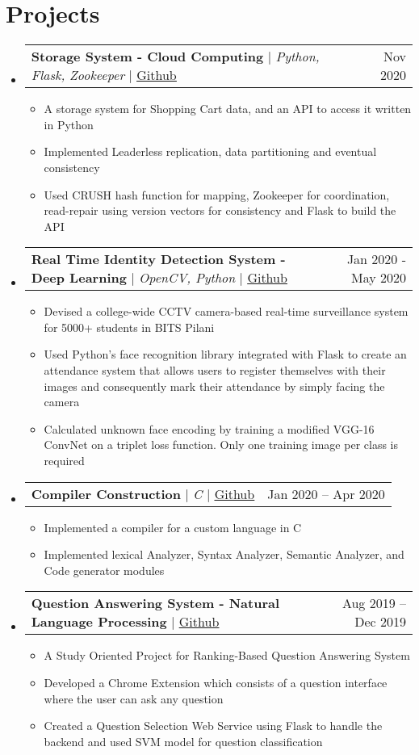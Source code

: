 \documentclass[res,10pt]{article}
\makeatletter
\newcommand{\resumeItem}[1]{
  \item\small{
    {#1 \vspace{-2pt}}
  }
}
\newcommand{\resumeProjectHeading}[2]{
    \item
    \begin{tabular*}{0.97\textwidth}{l@{\extracolsep{\fill}}r}
      \small#1 & #2 \\
    \end{tabular*}\vspace{-7pt}
}
\newcommand{\resumeSubHeadingListStart}{\begin{itemize}[leftmargin=0.15in, label={}]}
\newcommand{\resumeSubHeadingListEnd}{\end{itemize}}
\newcommand{\resumeItemListStart}{\begin{itemize}}
\newcommand{\resumeItemListEnd}{\end{itemize}\vspace{-5pt}}
\makeatother
\begin{document}
\section{Projects}
    \resumeSubHeadingListStart
      \resumeProjectHeading
          {\textbf{Storage System - Cloud Computing} $|$ \emph{Python, Flask, Zookeeper} $|$ \href{https://github.com/vismit2000/ShoppingCart-Cloud}{\underline{Github}}}{Nov 2020}
          \resumeItemListStart
            \resumeItem{A storage system for Shopping Cart data, and an API to access it written in Python}
            \resumeItem{Implemented Leaderless replication, data partitioning and eventual consistency}
            \resumeItem{Used CRUSH hash function for mapping, Zookeeper for coordination, read-repair using version vectors for consistency and Flask to build the API}
          \resumeItemListEnd
      \resumeProjectHeading
          {\textbf{Real Time Identity Detection System - Deep Learning} $|$ \emph{OpenCV, Python} $|$ \href{https://github.com/vismit2000/face-recognition-attendance-system}{\underline{Github}}}{Jan 2020 - May 2020}
          \resumeItemListStart
            \resumeItem{Devised a college-wide CCTV camera-based real-time surveillance system for 5000+ students in BITS Pilani}
            \resumeItem{Used Python’s face recognition library integrated with Flask to create an attendance system that allows users to register themselves with their images and consequently mark their attendance by simply facing the camera}
            \resumeItem{Calculated unknown face encoding by training a modified VGG-16 ConvNet on a triplet loss function. Only one training image per class is required}
          \resumeItemListEnd
      \resumeProjectHeading
          {\textbf{Compiler Construction} $|$ \emph{C} $|$ \href{https://github.com/vismit2000/Compiler-Construction}{\underline{Github}}}{Jan 2020 -- Apr 2020}
          \resumeItemListStart
            \resumeItem{Implemented a compiler for a custom language in C}
            \resumeItem{Implemented lexical Analyzer, Syntax Analyzer, Semantic Analyzer, and Code generator modules}
          \resumeItemListEnd
      \resumeProjectHeading
          {\textbf{Question Answering System - Natural Language Processing} $|$ \href{https://github.com/vismit2000/Ranking-Based-Question-Answering-System}{\underline{Github}}}{Aug 2019 -- Dec 2019}
          \resumeItemListStart
            \resumeItem{A Study Oriented Project for Ranking-Based Question Answering System}
            \resumeItem{Developed a Chrome Extension which consists of a question interface where the user can ask any question}
            \resumeItem{Created a Question Selection Web Service using Flask to handle the backend and used SVM model for question classification}
          \resumeItemListEnd
    \resumeSubHeadingListEnd
\end{document}
